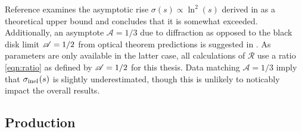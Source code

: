

Reference \cite{Fagundes_2013} examines the asymptotic rise $\sigma(s) \propto \ln^2(s)$ derived in \cite{Froissart_1961}
as a theoretical upper bound and concludes that it is somewhat exceeded. Additionally, an asymptote $\mathscr{A} = 1/3$ due to
diffraction as opposed to the black disk limit $\mathscr{A} = 1/2 \kern+0.2pt$ from optical theorem predictions is suggested
in \cite{Fagundes_2013}. As parameters are only available in the latter case, all calculations of $\mathscr{R}$
use a ratio \eqref{eqn:ratio} as defined by $\mathscr{A} = 1/2 \kern+0.2pt$ for this thesis. Data matching $\mathscr{A} = 1/3$
imply that $\sigma_{\text{inel}\kern+0.5pt}(s)$ is slightly underestimated, though this is unlikely to
noticably impact the overall results.





\subsection{Production}
\label{sub:production}

